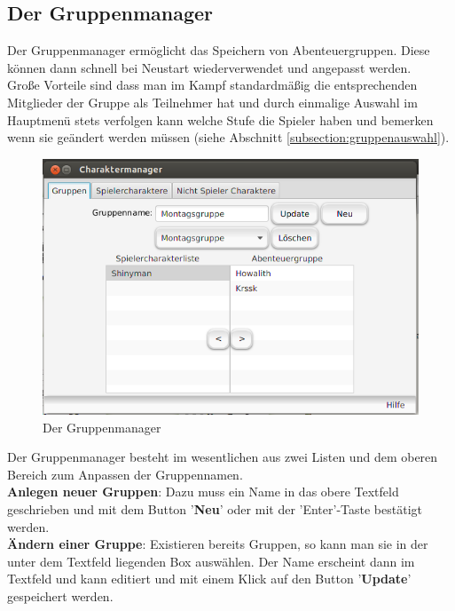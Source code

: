 \documentclass[11pt, a4paper, german]{article}
\begin{document}
\subsection{Der Gruppenmanager}
Der Gruppenmanager ermöglicht das Speichern von Abenteuergruppen. Diese können dann schnell bei Neustart wiederverwendet und angepasst werden.\\
Große Vorteile sind dass man im Kampf standardmäßig die entsprechenden Mitglieder der Gruppe als Teilnehmer hat und durch einmalige Auswahl im Hauptmenü stets verfolgen kann welche Stufe die Spieler haben und bemerken wenn sie geändert werden müssen (siehe Abschnitt \ref{subsection:gruppenauswahl}).\\
\begin{figure}
\centering
\includegraphics[width=1\linewidth]{Bilder/Gruppenmanager}
\caption{Der Gruppenmanager}
\label{fig:Gruppenmanager}
\end{figure}

Der Gruppenmanager besteht im wesentlichen aus zwei Listen und dem oberen Bereich zum Anpassen der Gruppennamen.\\

\textbf{Anlegen neuer Gruppen}: Dazu muss ein Name in das obere Textfeld geschrieben und mit dem Button '\textbf{Neu}' oder mit der 'Enter'-Taste bestätigt werden.\\

\textbf{Ändern einer Gruppe}: Existieren bereits Gruppen, so kann man sie in der unter dem Textfeld liegenden Box auswählen. Der Name erscheint dann im Textfeld und kann editiert und mit einem Klick auf den Button '\textbf{Update}' gespeichert werden. \\
\end{document}
